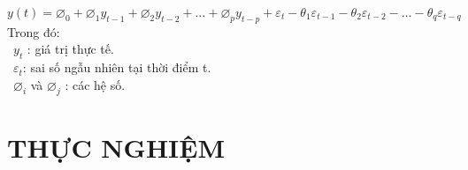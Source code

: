 \documentclass[conference]{IEEEtran}
\begin{document}
\( y(t) = \varnothing_0 + \varnothing_1 y_{t-1} + \varnothing_2 y_{t-2} + \ldots + \varnothing_p y_{t-p} + \varepsilon_t - \theta_1 \varepsilon_{t-1} - \theta_2 \varepsilon_{t-2} - \ldots - \theta_q \varepsilon_{t-q} \) \\

Trong đó:\\
	\indent\textbullet\ \(y_t\) : giá trị thực tế.\\
	\indent\textbullet\ $\varepsilon_t$: sai số ngẫu nhiên tại thời điểm t.\\
        \indent\textbullet\ $\varnothing_i$ và $\varnothing_j$ : các hệ số.\\

\section{THỰC NGHIỆM}
\end{document}
